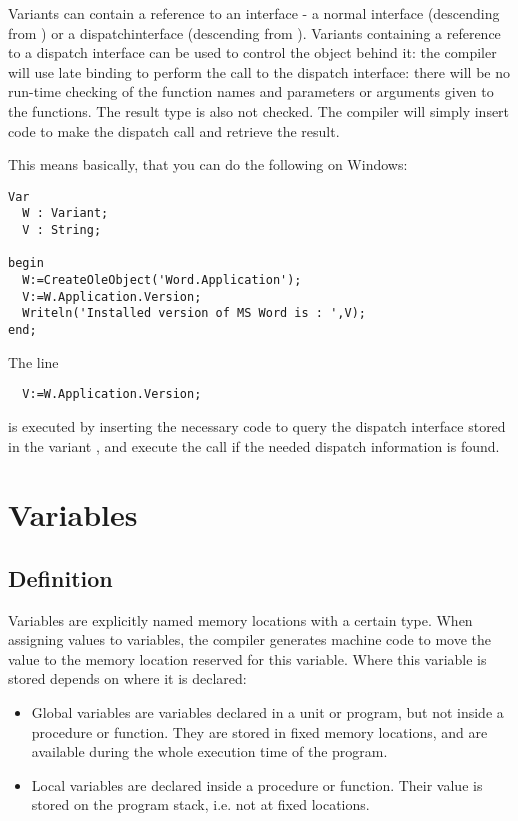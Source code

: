 Variants can contain a reference to an interface - a normal interface
(descending from ) or a dispatchinterface (descending 
from ). Variants containing a reference to a dispatch
interface can be used to control the object behind it: the compiler will use
late binding to perform the call to the dispatch interface: there will be no
run-time checking of the function names and parameters or arguments given to 
the functions. The result type is also not checked. The compiler will simply
insert code to make the dispatch call and retrieve the result. 

This means basically, that you can do the following on Windows:
\begin{verbatim}
Var
  W : Variant;
  V : String;

begin
  W:=CreateOleObject('Word.Application');
  V:=W.Application.Version;
  Writeln('Installed version of MS Word is : ',V);
end;
\end{verbatim}
The line 
\begin{verbatim}
  V:=W.Application.Version;
\end{verbatim}
is executed by inserting the necessary code to query the dispatch interface
stored in the variant , and execute the call if the needed dispatch
information is found.

\chapter{Variables}
\label{ch:Variables}
\section{Definition}
Variables are explicitly named memory locations with a certain type. When
assigning values to variables, the \fpc compiler generates machine code 
to move the value to the memory location reserved for this variable. Where
this variable is stored depends on where it is declared:

\begin{itemize}
\item Global variables are variables declared in a unit or program, but not
inside a procedure or function. They are stored in fixed memory locations,
and are available during the whole execution time of the program.
\item Local variables are declared inside a procedure or function. Their
value is stored on the program stack, i.e. not at fixed locations.
\end{itemize}

